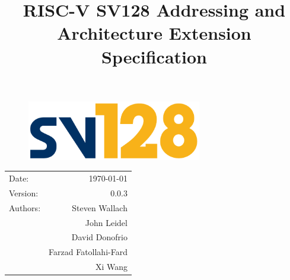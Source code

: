 \documentclass{article}
\title{\textbf{RISC-V SV128 Addressing and\\Architecture Extension Specification}} %
\date{} %
\begin{document}
\begin{figure}
\vspace{2in}
\begin{center}
\includegraphics[width=3in]{figures/sv128.pdf} %
\end{center}
\end{figure}

\maketitle %

\thispagestyle{fancy}

\begin{center}
\begin{tabular}{l r}
Date: & \today \\
Version: & 0.0.3 \\ %
Authors: & Steven Wallach\\
& John Leidel\\
& David Donofrio\\
& Farzad Fatollahi-Fard\\
& Xi Wang
\end{tabular}
\end{center}

\clearpage

\tableofcontents

\clearpage




\clearpage
\listoffigures
\listoftables
\clearpage
\end{document}
